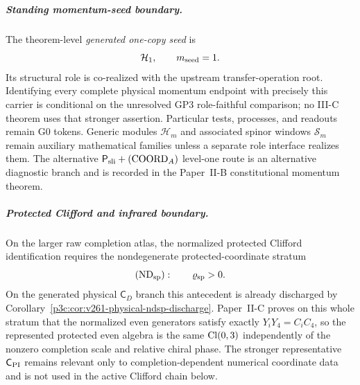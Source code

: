 \documentclass[12pt,a4paper]{article}
\begin{document}
\subparagraph{Standing momentum-seed boundary.}
The theorem-level \emph{generated one-copy seed} is
\[
        \mathcal H_1,\qquad m_{\rm seed}=1.
\]
Its structural role is co-realized with the upstream transfer-operation
root.  Identifying every complete physical momentum endpoint with precisely
this carrier is conditional on the unresolved GP3 role-faithful comparison;
no III-C theorem uses that stronger assertion.  Particular
tests, processes, and readouts remain G0 tokens.
Generic modules \(\mathcal H_m\) and associated spinor windows
\(\mathcal S_m\) remain auxiliary mathematical families unless a separate
role interface realizes them.  The alternative
\(\mathsf P_{\rm sli}+(\mathrm{COORD}_A)\) level-one route is an alternative
diagnostic branch and is recorded in the Paper~II-B constitutional momentum theorem.

\subparagraph{Protected Clifford and infrared boundary.}
On the larger raw completion atlas, the normalized protected Clifford
identification requires the nondegenerate protected-coordinate stratum
\[
 (\mathrm{ND}_{\rm sp}):\qquad \varrho_{\rm sp}>0.
\]
On the generated physical \(\mathsf C_D\) branch this antecedent is already
discharged by Corollary~\ref{p3c:cor:v261-physical-ndsp-discharge}.
Paper~II-C proves on this whole stratum that the normalized even generators
satisfy exactly \(Y_iY_4=C_iC_4\), so the represented protected even algebra
is the same \(\operatorname{Cl}(0,3)\) independently of the nonzero completion scale and
relative chiral phase.  The stronger representative \(\mathsf C_{\rm PI}\)
remains relevant only to completion-dependent numerical coordinate data and
is not used in the active Clifford chain below.
\end{document}
